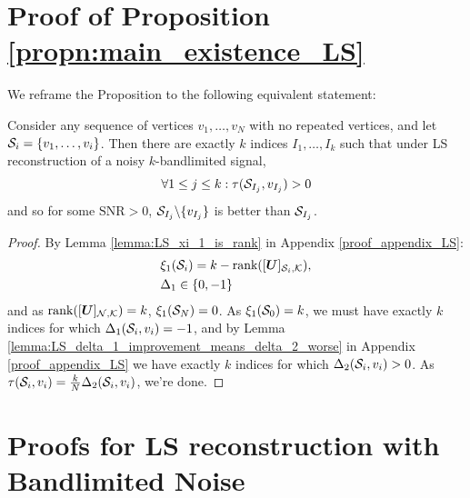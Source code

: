 \section{Proof of Proposition \ref{propn:main_existence_LS}}
\label{app:LS_satisfied}
We reframe the Proposition to the following equivalent statement:

    Consider any sequence of vertices $v_{1},\dots, v_{N}$ with no repeated vertices, and let $\mathcal{S}_{i} = \{v_{1} , \dots , v_{i} \}$. Then there are exactly $k$ indices $I_{1}, \dots, I_{k}$ such that under LS reconstruction of a noisy $k$-bandlimited signal,
    \begin{equation}
        \forall 1\leq j \leq k: \tau(\mathcal{S}_{I_{j}}, v_{I_{j}}) > 0
    \end{equation}
    and so for some $\text{SNR}>0$, $\mathcal{S}_{I_{j}} \backslash \{v_{I_{j}}\}$ is better than $\mathcal{S}_{I_{j}}$.

\begin{proof}
\label{app:proof_main_existence_LS}
By Lemma \ref{lemma:LS_xi_1_is_rank} in Appendix \ref{proof_appendix_LS}: 
\begin{align}
    &\xi_{1}(\mathcal{S}_{i}) = k -\text{rank}([\bm{U}]_{\mathcal{S}_{i}, \mathcal{K}}), \\
    &\Delta_{1} \in \{0,-1\}
\end{align}
 and as $\text{rank}(\matrsubU{N}) = k$, $\xi_{1}(\mathcal{S}_{N}) = 0$. As $\xi_{1}(\mathcal{S}_{0}) = k$, we must have exactly $k$ indices for which $\Delta_{1}(\mathcal{S}_{i}, v_{i}) = -1$, and by Lemma \ref{lemma:LS_delta_1_improvement_means_delta_2_worse} in Appendix \ref{proof_appendix_LS}  
  we have exactly $k$ indices for which $\Delta_{2}(\mathcal{S}_{i}, v_{i}) > 0$. As $\tau (\mathcal{S}_{i}, v_{i})= \frac{k}{N} \Delta_{2}(\mathcal{S}_{i}, v_{i})$, we're done.
\end{proof}

\section{Proofs for LS reconstruction with Bandlimited Noise}
\label{app:LS_Bandlimited_Noise_proofs}
